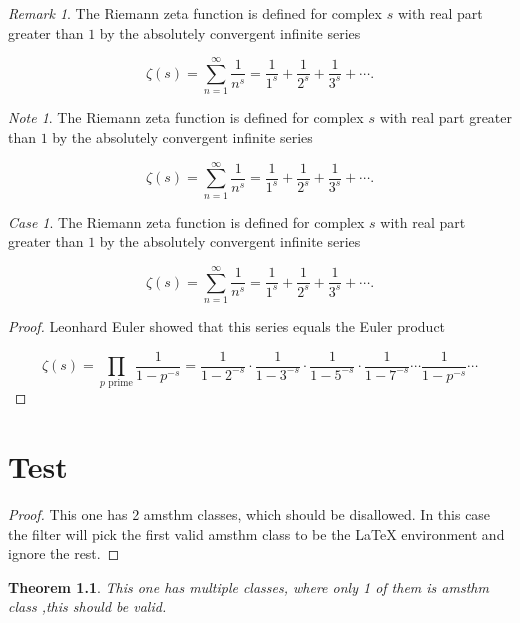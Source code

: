 \documentclass[english,oneside, article]{memoir}
\theoremstyle{plain}
\newtheorem{Theorem}{Theorem}[chapter]
\theoremstyle{definition}
\theoremstyle{remark}
\newtheorem{Case}{Case}[chapter]
\newtheorem*{Remark}{Remark}
\newtheorem*{Note}{Note}
\begin{document}
\begin{Remark}

The Riemann zeta function is defined for complex \(s\) with real part
greater than \(1\) by the absolutely convergent infinite series

\[\zeta(s) = \sum_{n=1}^\infty \frac{1}{n^s} = \frac{1}{1^s} + \frac{1}{2^s} + \frac{1}{3^s} + \cdots.\]

\end{Remark}

\begin{Note}

The Riemann zeta function is defined for complex \(s\) with real part
greater than \(1\) by the absolutely convergent infinite series

\[\zeta(s) = \sum_{n=1}^\infty \frac{1}{n^s} = \frac{1}{1^s} + \frac{1}{2^s} + \frac{1}{3^s} + \cdots.\]

\end{Note}

\begin{Case}

The Riemann zeta function is defined for complex \(s\) with real part
greater than \(1\) by the absolutely convergent infinite series

\[\zeta(s) = \sum_{n=1}^\infty \frac{1}{n^s} = \frac{1}{1^s} + \frac{1}{2^s} + \frac{1}{3^s} + \cdots.\]

\end{Case}

\begin{proof}

Leonhard Euler showed that this series equals the Euler product

\[\zeta(s) = \prod_{p \text{ prime}} \frac{1}{1-p^{-s}}= \frac{1}{1-2^{-s}}\cdot\frac{1}{1-3^{-s}}\cdot\frac{1}{1-5^{-s}}\cdot\frac{1}{1-7^{-s}} \cdots \frac{1}{1-p^{-s}} \cdots\]

\end{proof}

\chapter{Test}\label{test}

\begin{proof}

This one has 2 amsthm classes, which should be disallowed. In this case
the filter will pick the first valid amsthm class to be the LaTeX
environment and ignore the rest.

\end{proof}

\begin{Theorem}

This one has multiple classes, where only 1 of them is amsthm class
,this should be valid.

\end{Theorem}
\end{document}
